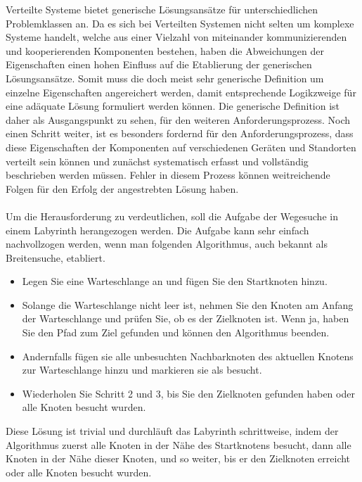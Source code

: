 \documentclass[../vs-script-first-v01.tex]{subfiles}
\begin{document}
Verteilte Systeme bietet generische Lösungsansätze für unterschiedlichen Problemklassen an. Da es sich bei Verteilten Systemen nicht selten um komplexe Systeme handelt, welche aus einer Vielzahl von miteinander kommunizierenden und kooperierenden Komponenten bestehen, haben die Abweichungen der Eigenschaften einen hohen Einfluss auf die Etablierung der generischen Lösungsansätze. Somit muss die doch meist sehr generische Definition um einzelne Eigenschaften angereichert werden, damit entsprechende Logikzweige für eine adäquate Lösung formuliert werden können. Die generische Definition ist daher als Ausgangspunkt zu sehen, für den weiteren Anforderungsprozess. Noch einen Schritt weiter, ist es besonders fordernd für den Anforderungsprozess, dass diese Eigenschaften der Komponenten auf verschiedenen Geräten und Standorten verteilt sein können und zunächst systematisch erfasst und vollständig beschrieben werden müssen. Fehler in diesem Prozess können weitreichende Folgen für den Erfolg der angestrebten Lösung haben. 
\\\\
Um die Herausforderung zu verdeutlichen, soll die Aufgabe der Wegesuche in einem Labyrinth herangezogen werden. Die Aufgabe kann sehr einfach nachvollzogen werden, wenn man folgenden Algorithmus, auch bekannt als Breitensuche, etabliert. 

\begin{itemize}
\item Legen Sie eine Warteschlange an und fügen Sie den Startknoten hinzu.

\item Solange die Warteschlange nicht leer ist, nehmen Sie den Knoten am Anfang der Warteschlange und prüfen Sie, ob es der Zielknoten ist. Wenn ja, haben Sie den Pfad zum Ziel gefunden und können den Algorithmus beenden.

\item Andernfalls fügen sie alle unbesuchten Nachbarknoten des aktuellen Knotens zur Warteschlange hinzu und markieren sie als besucht.

\item Wiederholen Sie Schritt 2 und 3, bis Sie den Zielknoten gefunden haben oder alle Knoten besucht wurden.
\end{itemize}
Diese Lösung ist trivial und durchläuft das Labyrinth schrittweise, indem der Algorithmus zuerst alle Knoten in der Nähe des Startknotens besucht, dann alle Knoten in der Nähe dieser Knoten, und so weiter, bis er den Zielknoten erreicht oder alle Knoten besucht wurden.
\end{document}
